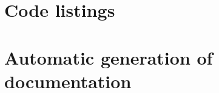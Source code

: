 \documentclass[conference]{IEEEtran}
\begin{document}




\clearpage
\onecolumn
\appendices
\section{Code listings}

\lstlistoflistings

\label{listing:youtube}
\label{listing:sentiment_analysis}
\label{listing:webserve}
\label{listing:models}
\label{listing:database}

\label{listing:test_flask}
\label{listing:test_youtube}
\label{listing:test_sentiment_analysis}
\label{listing:test_codeformat}

\newpage
\section{Automatic generation of documentation}
\end{document}
